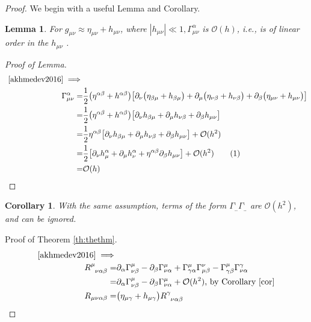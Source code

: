 \documentclass[]{article}
\newtheorem{lemma}[theorem]{Lemma}
\newtheorem{corollary}[theorem]{Corollary}
\newcommand\numberthis{\addtocounter{equation}{1}\tag{\theequation}}
\begin{document}
\begin{proof}
	We begin with a useful Lemma and Corollary.
	\begin{lemma}\label{lemma:gamma}
		For $g_{\mu\nu} \approx \eta_{\mu\nu} + h_{\mu\nu}$, where $|h_{\mu\nu}| \ll 1,  \Gamma^{\alpha}_{\mu\nu}$ is $\mathcal{O}(h)$, i.e., is of linear order in the $h_{\mu\nu}$ .
	\end{lemma}
    \begin{proof}[Proof of Lemma]
    	\begin{align*}
    	\text{	\cite[(46)]{akhmedev2016}}\implies&\\
    	\Gamma^{\alpha}_{\mu\nu} =& \frac{1}{2} \big(\eta^{\alpha\beta}+h^{\alpha\beta}\big)\big[\partial_{\nu}\big(\eta_{\beta\mu}+h_{\beta\mu}\big)+\partial_{\mu}\big(\eta_{\nu\beta}+h_{\nu\beta}\big)+\partial_{\beta}\big(\eta_{\mu\nu}+h_{\mu\nu}\big)\big] \\
    	=& \frac{1}{2} \big(\eta^{\alpha\beta}+h^{\alpha\beta}\big)\big[\partial_{\nu}h_{\beta\mu}+\partial_{\mu}h_{\nu\beta}+\partial_{\beta}h_{\mu\nu}\big]\\
    	=& \frac{1}{2} \eta^{\alpha\beta}\big[\partial_{\nu}h_{\beta\mu}+\partial_{\mu}h_{\nu\beta}+\partial_{\beta}h_{\mu\nu}\big] + \mathcal{O}(h^2)\\
    	=& \frac{1}{2} \big[\partial_{\nu}h^{\alpha}_{\mu}+\partial_{\mu}h^{\alpha}_{\nu}+\eta^{\alpha\beta}\partial_{\beta}h_{\mu\nu}\big] + \mathcal{O}(h^2) \numberthis\label{eq:Gamma} \\
    	=& \mathcal{O}(h)
    	\end{align*}
    \end{proof}
	\begin{corollary}\label{cor}
		With the same assumption, terms of the form $\Gamma^{.}_{..}\Gamma^{.}_{..}$ are $\mathcal{O}(h^2)$, and can be ignored.
	\end{corollary}
	Proof of Theorem \ref{th:thethm}.
	\begin{align*}
	\text{\cite[(53)]{akhmedev2016}}\implies&\\
	R\indices{^{\mu}_{\nu\alpha\beta}}=&\partial_{\alpha}\Gamma^{\mu}_{\nu\beta} - \partial_{\beta}\Gamma^{\mu}_{\nu\alpha} + \Gamma^{\mu}_{\gamma\alpha}\Gamma^{\nu}_{\mu\beta} - \Gamma^{\mu}_{\gamma\beta} \Gamma^{\gamma}_{\nu\alpha}\\
	=& \partial_{\alpha}\Gamma^{\mu}_{\nu\beta} - \partial_{\beta}\Gamma^{\mu}_{\nu\alpha} + \mathcal{O}(h^2)\text{, by Corollary \ref{cor}}\\
	R_{\mu\nu\alpha\beta} =&\big(\eta_{\mu\gamma}+h_{\mu\gamma}\big)	R\indices{^{\gamma}_{\nu\alpha\beta}}\\

\end{align*}
\end{proof}
\end{document}

